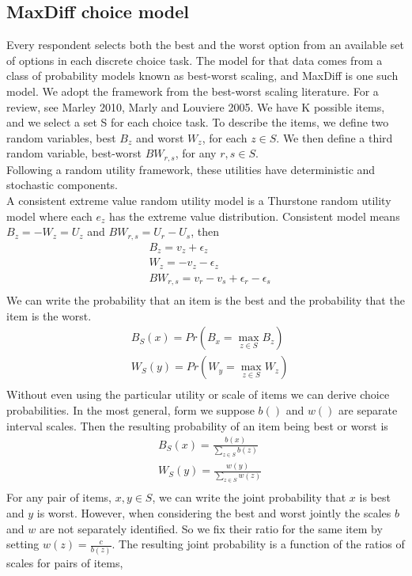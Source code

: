 \documentclass[mksc,blindrev]{informs3} %
\begin{document}
\subsection{MaxDiff choice model}
Every respondent selects both the best and the worst option from an available set of options in each discrete choice task. The model for that data comes from a class of probability models known as best-worst scaling, and MaxDiff is one such model. We adopt the framework from the best-worst scaling literature. For a review, see Marley 2010, Marly and Louviere 2005. 
We have K possible items, and we select a set S for each choice task. To describe the items, we define two random variables, best $B_z$ and worst $W_z$, for each $z \in S$.  We then define a third random variable, best-worst $BW_{r,s}$, for any $r,s \in S$.\\
Following a random utility framework, these utilities have deterministic and stochastic components.\\ 
A consistent extreme value random utility model is a Thurstone random utility model where each $e_z$ has the extreme value distribution. Consistent model means $B_z=-W_z=U_z$ and $BW_{r,s}=U_r-U_s$, then
\begin{align*}
&B_z=v_z+\epsilon_z\\
&W_z=-v_z-\epsilon_z\\
&BW_{r,s}=v_r-v_s+\epsilon_r-\epsilon_s\\
\end{align*}
We can write the probability that an item is the best and the probability that the item is the worst. 
\begin{align*}
&B_S (x)= Pr⁡( B_x=\max_{z \in S} B_z)\\
&W_S (y)= Pr⁡( W_y=\max_{z \in S} W_z)\\
\end{align*}
Without even using the particular utility or scale of items we can derive choice probabilities. In the most general, form we suppose $b()$ and $w()$ are separate interval scales. Then the resulting probability of an item being best or worst is
\begin{align*}
&B_S (x)= \frac{b(x)}{\sum_{z \in S}b(z)}\\
&W_S (y)= \frac{w(y)}{\sum_{z \in S}w(z)}\\
\end{align*}
For any pair of items, $x,y \in S$, we can write the joint probability that $x$ is best and $y$ is worst. However, when considering the best and worst jointly the scales $b$ and $w$ are not separately identified. So we fix their ratio for the same item by setting $w(z)=\frac{c}{b(z)}$. The resulting joint probability is a function of the ratios of scales for pairs of items, 
\end{document}
